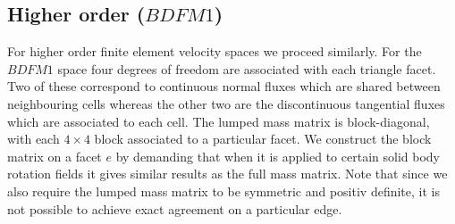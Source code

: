 \documentclass[12pt]{article}
\begin{document}
\subsection{Higher order ($BDFM1$)}
For higher order finite element velocity spaces we proceed similarly. For the $BDFM1$ space four degrees of freedom are associated with each triangle facet. Two of these correspond to continuous normal fluxes which are shared between neighbouring cells whereas the other two are the discontinuous tangential fluxes which are associated to each cell.
The lumped mass matrix is block-diagonal, with each $4\times4$ block associated to a particular facet. We construct the block matrix on a facet $e$ by demanding that when it is applied to certain solid body rotation fields it gives similar results as the full mass matrix. Note that since we also require the lumped mass matrix to be symmetric and positiv definite, it is not possible to achieve exact agreement on a particular edge.
\end{document}
